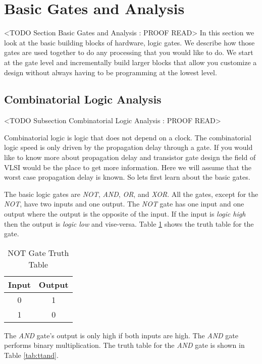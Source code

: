 \section{Basic Gates and Analysis}
	<TODO Section Basic Gates and Analysis : PROOF READ>
In this section we look at the basic building blocks of hardware, logic gates. We describe how those gates are used together to do any processing that you would like to do. We start at the gate level and incrementally build larger blocks that allow you customize a design without always having to be programming at the lowest level.

\subsection{Combinatorial Logic Analysis}
	<TODO Subsection Combinatorial Logic Analysis : PROOF READ>

Combinatorial logic is logic that does not depend on a clock. The combinatorial logic speed is only driven by the propagation delay through a gate. If you would like to know more about propagation delay and transistor gate design the field of \ac{VLSI} would be the place to get more information. Here we will assume that the worst case propagation delay is known. So lets first learn about the basic gates.
	
The basic logic gates are \emph{NOT}, \emph{AND}, \emph{OR}, and \emph{XOR}. All the gates, except for the \emph{NOT}, have two inputs and one output. The \emph{NOT} gate has one input and one output where the output is the opposite of the input. If the input is \emph{logic high} then the output is \emph{logic low} and vise-versa. Table \ref{tab:ttnot} shows the truth table for the gate.
	
\begin{table}[h!]  
\begin{center}    
\caption{NOT Gate Truth Table} 
\label{tab:ttnot} 
\begin{tabular}{|c|c|}  
\textbf{Input} & \textbf{Output}\\  
\hline  
0 & 1\\  
1 & 0\\ 
\end{tabular}  
\end{center}
\end{table}

The \emph{AND} gate's output is only high if both inputs are high. The \emph{AND} gate performs binary multiplication. The truth table for the \emph{AND} gate is shown in Table \ref{tab:ttand}.


